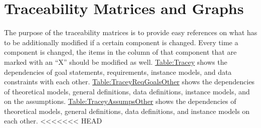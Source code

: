 \documentclass[12pt]{article}
\begin{document}
\section{Traceability Matrices and Graphs}
\label{Sec:TraceMatrices}
The purpose of the traceability matrices is to provide easy references on what has to be additionally modified if a certain component is changed. Every time a component is changed, the items in the column of that component that are marked with an ``X'' should be modified as well. \hyperref[Table:Tracey]{Table:Tracey} shows the dependencies of goal statements, requirements, instance models, and data constraints with each other. \hyperref[Table:TraceyReqGoalsOther]{Table:TraceyReqGoalsOther} shows the dependencies of theoretical models, general definitions, data definitions, instance models, and on the assumptions. \hyperref[Table:TraceyAssumpsOther]{Table:TraceyAssumpsOther} shows the dependencies of theoretical models, general definitions, data definitions, and instance models on each other.
<<<<<<< HEAD
\end{document}
